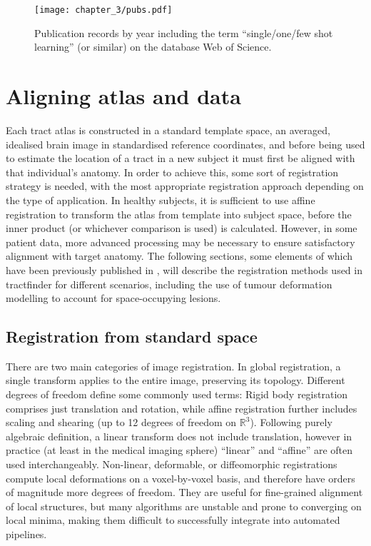 \documentclass[12pt,phd,a4paper,twoside]{ucl_thesis}
\renewcommand{\textcite}[2][]{
\ifthenelse { \equal {#1} {} }  {\citeauthor{#2}\autocite{#2}}   {\citeauthor{#1}\autocite{#2}}}
\begin{document}
\begin{SCfigure}[][h!]
  \centering
  \texttt{[image: chapter\_3/pubs.pdf]}
  \caption[Publications on few-shot learning]{Publication records by year including the term ``single/one/few shot learning'' (or similar) on the database Web of Science.}
  \label{fig:pubs}
\end{SCfigure}
\clearpage{}

\clearpage{}\chapter{Aligning atlas and data}
\label{chap:reg}

Each tract atlas is constructed in a standard template space, an averaged, idealised brain image in standardised reference coordinates, and before being used to estimate the location of a tract in a new subject it must first be aligned with that individual's anatomy.
In order to achieve this, some sort of registration strategy is needed, with the most appropriate registration approach depending on the type of application.
In healthy subjects, it is sufficient to use affine registration to transform the atlas from template into subject space, before the inner product (or whichever comparison is used) is calculated.
However, in some patient data, more advanced processing may be necessary to ensure satisfactory alignment with target anatomy.
The following sections, some elements of which have been previously published in \textcite{Young2022}, will describe the registration methods used in tractfinder for different scenarios, including the use of tumour deformation modelling to account for space-occupying lesions.

\section{Registration from standard space}
\label{sec:reg1}

There are two main categories of image registration.
In global registration, a single transform applies to the entire image, preserving its topology.
Different degrees of freedom define some commonly used terms:
Rigid body registration comprises just translation and rotation, while affine registration further includes scaling and shearing (up to 12 degrees of freedom on $\mathbb{R}^3$).
Following purely algebraic definition, a linear transform does not include translation, however in practice (at least in the medical imaging sphere) ``linear'' and ``affine'' are often used interchangeably.
Non-linear, deformable, or diffeomorphic registrations compute local deformations on a voxel-by-voxel basis, and therefore have orders of magnitude more degrees of freedom.
They are useful for fine-grained alignment of local structures, but many algorithms are unstable and prone to converging on local minima, making them difficult to successfully integrate into automated pipelines.
\end{document}
